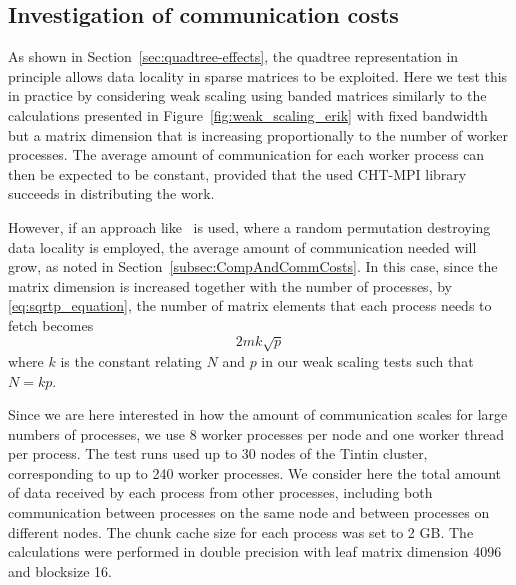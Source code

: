 \documentclass{elsarticle}
\begin{document}
\subsection{Investigation of communication costs}\label{subsec:communication}

As shown in Section~\ref{sec:quadtree-effects}, the quadtree
representation in principle allows data locality in sparse matrices to
be exploited. Here we test this in practice by considering weak
scaling using banded matrices similarly to the calculations presented
in Figure~\ref{fig:weak_scaling_erik} with fixed bandwidth but a
matrix dimension that is increasing proportionally to the number of
worker processes.  The average amount of communication for each worker
process can then be expected to be constant, provided that the used
CHT-MPI library succeeds in distributing the work.


However, if an approach like~\cite{BulucGilbert2012, Borstnik2014} is
used, where a random permutation destroying data locality is employed,
the average amount of communication needed will grow, as noted in
Section~\ref{subsec:CompAndCommCosts}.  In this case, since the matrix
dimension is increased together with the number of processes, by
\eqref{eq:sqrtp_equation}, the number of matrix elements that each
process needs to fetch becomes
\begin{equation} \label{eq:sqrtp_eq2}
  2mk\sqrt{p}
\end{equation}
where $k$ is the constant relating $N$ and $p$ in our weak scaling
tests such that $N = kp$.



Since we are here interested in how the amount of communication
scales for large numbers of processes, we use 8 worker processes per
node and one worker thread per process. 
The test runs used up to 30 nodes of the Tintin cluster, corresponding
to up to 240 worker processes.
We consider here the total amount of data received by each process
from other processes, including both communication between processes
on the same node and between processes on different nodes.
The chunk cache size for each process was set to 2 GB.
The calculations were performed in double precision with leaf matrix
dimension 4096 and blocksize 16.
\end{document}
